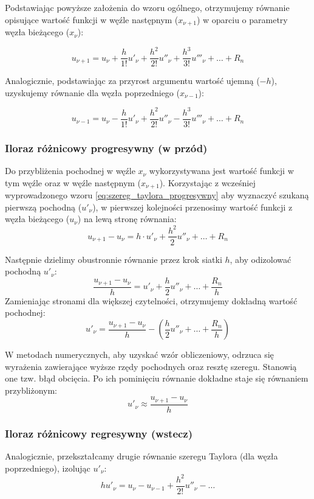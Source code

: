 \documentclass[a4paper,14pt]{scrartcl}
\begin{document}
\newpage

Podstawiając powyższe założenia do wzoru ogólnego, otrzymujemy równanie opisujące wartość funkcji w węźle następnym ($x_{\nu+1}$) w oparciu o parametry węzła bieżącego ($x_\nu$):

\begin{equation}
    \label{eq:szereg_taylora_progresywny}
    u_{\nu+1} = u_\nu + \frac{h}{1!}u'_\nu + \frac{h^2}{2!}u''_\nu + \frac{h^3}{3!}u'''_\nu + \dots + R_n
\end{equation}

Analogicznie, podstawiając za przyrost argumentu wartość ujemną ($-h$), uzyskujemy równanie dla węzła poprzedniego ($x_{\nu-1}$):

\begin{equation}
    u_{\nu-1} = u_\nu - \frac{h}{1!}u'_\nu + \frac{h^2}{2!}u''_\nu - \frac{h^3}{3!}u'''_\nu + \dots + R_n
\end{equation}

\subsubsection{Iloraz różnicowy progresywny (w przód)}
Do przybliżenia pochodnej w węźle $x_{\nu}$ wykorzystywana jest wartość funkcji w tym węźle oraz w węźle następnym ($x_{\nu+1}$).
Korzystając z wcześniej wyprowadzonego wzoru \eqref{eq:szereg_taylora_progresywny} aby wyznaczyć szukaną pierwszą pochodną ($u'_\nu$), w pierwszej kolejności przenosimy wartość funkcji z węzła bieżącego ($u_\nu$) na lewą stronę równania:
\begin{equation*}
    u_{\nu+1} - u_\nu = h \cdot u'_\nu + \frac{h^2}{2}u''_\nu + \dots + R_n
\end{equation*}


Następnie dzielimy obustronnie równanie przez krok siatki $h$, aby odizolować pochodną
$u'_\nu$:$$\frac{u_{\nu+1} - u_\nu}{h} = u'_\nu + \frac{h}{2}u''_\nu + \dots + \frac{R_n}{h}$$
Zamieniając stronami dla większej czytelności, otrzymujemy dokładną wartość pochodnej:
$$u'_\nu = \frac{u_{\nu+1} - u_\nu}{h} - \left( \frac{h}{2}u''_\nu + \dots + \frac{R_n}{h} \right)$$

W metodach numerycznych, aby uzyskać wzór obliczeniowy, odrzuca się wyrażenia zawierające wyższe rzędy pochodnych oraz resztę szeregu. Stanowią one tzw. błąd obcięcia. Po ich pominięciu równanie dokładne staje się równaniem przybliżonym:
$$u'_\nu \approx \frac{u_{\nu+1} - u_\nu}{h}$$

\newpage
\subsubsection{Iloraz różnicowy regresywny (wstecz)}
Analogicznie, przekształcamy drugie równanie szeregu Taylora (dla węzła poprzedniego), izolując $u'_{\nu}$:
\begin{equation*}
    h u'_{\nu} = u_{\nu} - u_{\nu-1} + \frac{h^2}{2!}u''_{\nu} - \dots
\end{equation*}
\end{document}
